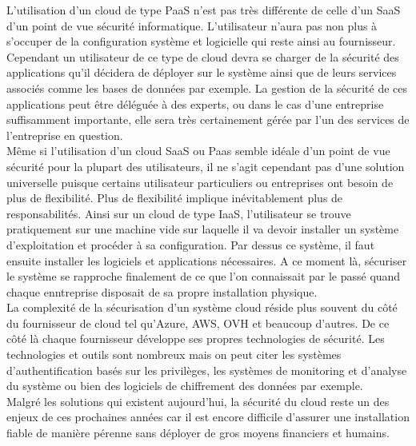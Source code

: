 \documentclass[a4paper, 12pt]{article}
\begin{document}
      L'utilisation d'un cloud de type PaaS n'est pas très différente de
      celle d'un SaaS d'un point de vue sécurité informatique. L'utilisateur
      n'aura pas non plus à s'occuper de la configuration système et logicielle
      qui reste ainsi au fournisseur. Cependant un utilisateur de ce type de
      cloud devra se charger de la sécurité des applications qu'il décidera de
      déployer sur le système ainsi que de leurs services associés comme les
      bases de données par exemple. La gestion de la sécurité de ces
      applications peut être déléguée à des experts, ou dans le cas d'une
      entreprise suffisamment importante, elle sera très certainement gérée
      par l'un des services de l'entreprise en question. \\

      Même si l'utilisation d'un cloud SaaS ou Paas semble idéale d'un point
      de vue sécurité pour la plupart des utilisateurs, il ne s'agit cependant
      pas d'une solution universelle puisque certains utilisateur particuliers
      ou entreprises ont besoin de plus de flexibilité. Plus de flexibilité
      implique inévitablement plus de responsabilités. Ainsi sur un cloud de
      type IaaS, l'utilisateur se trouve pratiquement sur une machine vide sur
      laquelle il va devoir installer un système d'exploitation et procéder à
      sa configuration. Par dessus ce système, il faut ensuite installer les
      logiciels et applications nécessaires. A ce moment là, sécuriser le
      système se rapproche finalement de ce que l'on connaissait par le passé
      quand chaque enntreprise disposait de sa propre installation physique. \\

      La complexité de la sécurisation d'un système cloud réside plus souvent
      du côté du fournisseur de cloud tel qu'Azure, AWS, OVH et beaucoup
      d'autres. De ce côté là chaque fournisseur développe ses propres
      technologies de sécurité. Les technologies et outils sont nombreux mais
      on peut citer les systèmes d'authentification basés sur les privilèges,
      les systèmes de monitoring et d'analyse du système ou bien des logiciels
      de chiffrement des données par exemple. \\

      Malgré les solutions qui existent aujourd'hui, la sécurité du cloud
      reste un des enjeux de ces prochaines années car il est encore difficile
      d'assurer une installation fiable de manière pérenne sans déployer de
      gros moyens financiers et humains.
\end{document}
